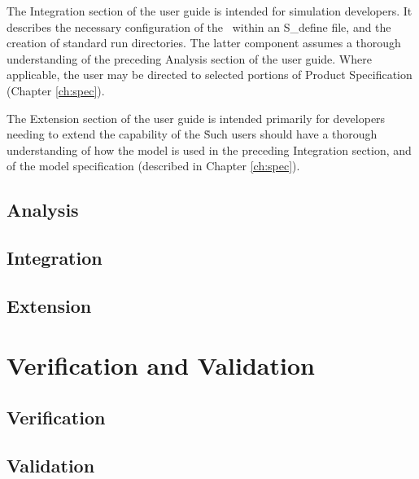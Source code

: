The Integration section of the user guide is intended for simulation developers.  
It describes the necessary configuration of the \ModelNameDesc\ within an 
S\_define file, and the creation of standard run directories.  The latter 
component assumes a thorough understanding of the preceding Analysis section of the user guide.
Where applicable, the user may be directed to selected portions of Product Specification (Chapter \ref{ch:spec}).

The Extension section of the user guide is intended primarily for developers 
needing to extend the capability of the \ModelNameDesc\.  Such users should have a 
thorough understanding of how the model is used in the preceding 
Integration section, and of the model 
specification (described in Chapter \ref{ch:spec}).

\section{Analysis}


\section{Integration}


\section{Extension}


\chapter{Verification and Validation}\label{ch:ivv}

\section{Verification}

\section{Validation}
